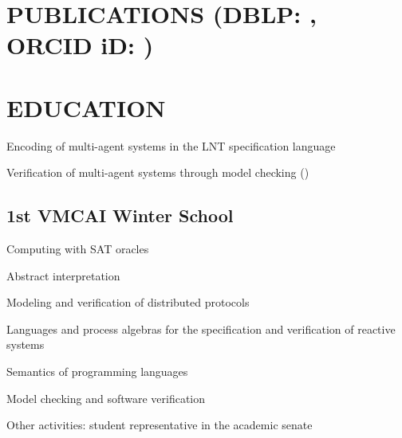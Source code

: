 \documentclass[a4paper]{deedy-resume-openfont}
\begin{document}
\hfill
\begin{minipage}[t]{0.67\textwidth} 

\section[Publications]{PUBLICATIONS \small{(DBLP\@: \href{https://dblp.org/pid/215/9758}{}, ORCID iD\@: \href{https://orcid.org/0000-0003-1922-3151}{})}}
\vspace{\topsep} %

\nocite{*}

\sectionsep%


\section{EDUCATION}

\begin{tightemize}
    \item Encoding of multi-agent systems in the LNT specification language
    \item Verification of multi-agent systems through model checking (\href{https://cadp.inria.fr/}{})
\end{tightemize}
\sectionsep%

\subsection{1st VMCAI Winter School}
\begin{tightemize}
    \item Computing with SAT oracles
    \item Abstract interpretation
    \item Modeling and verification of distributed protocols
\end{tightemize}
\sectionsep%

\begin{tightemize}
\item Languages and process algebras for the specification and verification of reactive systems
\item Semantics of programming languages
\item Model checking and software verification
\end{tightemize}
Other activities: student representative in the academic senate
\sectionsep%


\end{minipage}
\end{document}
